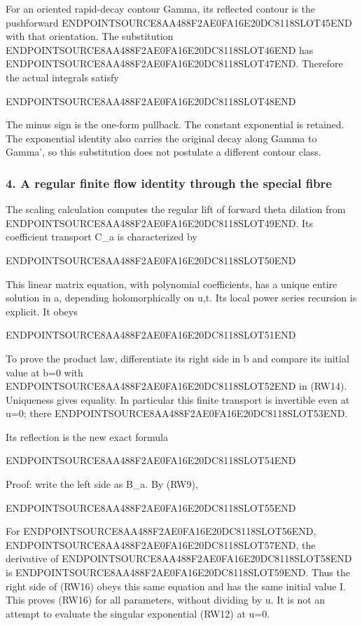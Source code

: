 For an oriented rapid-decay contour Gamma, its reflected contour is the pushforward ENDPOINTSOURCE8AA488F2AE0FA16E20DC8118SLOT45END with that orientation. The substitution ENDPOINTSOURCE8AA488F2AE0FA16E20DC8118SLOT46END has ENDPOINTSOURCE8AA488F2AE0FA16E20DC8118SLOT47END. Therefore the actual integrals satisfy

ENDPOINTSOURCE8AA488F2AE0FA16E20DC8118SLOT48END

The minus sign is the one-form pullback. The constant exponential is retained. The exponential identity also carries the original decay along Gamma to Gamma', so this substitution does not postulate a different contour class.

\subsubsection{4. A regular finite flow identity through the special fibre}\label{endpoint-f1_reflection--a-regular-finite-flow-identity-through-the-special-fibre}

The scaling calculation computes the regular lift of forward theta dilation from ENDPOINTSOURCE8AA488F2AE0FA16E20DC8118SLOT49END. Its coefficient transport C\_a is characterized by

ENDPOINTSOURCE8AA488F2AE0FA16E20DC8118SLOT50END

This linear matrix equation, with polynomial coefficients, has a unique entire solution in a, depending holomorphically on u,t. Its local power series recursion is explicit. It obeys

ENDPOINTSOURCE8AA488F2AE0FA16E20DC8118SLOT51END

To prove the product law, differentiate its right side in b and compare its initial value at b=0 with ENDPOINTSOURCE8AA488F2AE0FA16E20DC8118SLOT52END in (RW14). Uniqueness gives equality. In particular this finite transport is invertible even at u=0; there ENDPOINTSOURCE8AA488F2AE0FA16E20DC8118SLOT53END.

Its reflection is the new exact formula

ENDPOINTSOURCE8AA488F2AE0FA16E20DC8118SLOT54END

Proof: write the left side as B\_a. By (RW9),

ENDPOINTSOURCE8AA488F2AE0FA16E20DC8118SLOT55END

For ENDPOINTSOURCE8AA488F2AE0FA16E20DC8118SLOT56END, ENDPOINTSOURCE8AA488F2AE0FA16E20DC8118SLOT57END, the derivative of ENDPOINTSOURCE8AA488F2AE0FA16E20DC8118SLOT58END is ENDPOINTSOURCE8AA488F2AE0FA16E20DC8118SLOT59END. Thus the right side of (RW16) obeys this same equation and has the same initial value I. This proves (RW16) for all parameters, without dividing by u. It is not an attempt to evaluate the singular exponential (RW12) at u=0.

